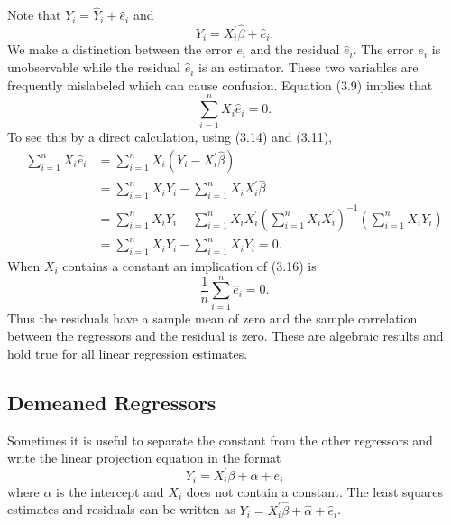 \documentclass[10pt]{article}
\begin{document}
Note that $Y_{i}=\widehat{Y}_{i}+\widehat{e}_{i}$ and
$$
Y_{i}=X_{i}^{\prime} \widehat{\beta}+\widehat{e}_{i} .
$$
We make a distinction between the error $e_{i}$ and the residual $\widehat{e}_{i}$. The error $e_{i}$ is unobservable while the residual $\widehat{e}_{i}$ is an estimator. These two variables are frequently mislabeled which can cause confusion. Equation (3.9) implies that
$$
\sum_{i=1}^{n} X_{i} \widehat{e}_{i}=0 .
$$
To see this by a direct calculation, using (3.14) and (3.11),
$$
\begin{aligned}
\sum_{i=1}^{n} X_{i} \widehat{e}_{i} &=\sum_{i=1}^{n} X_{i}\left(Y_{i}-X_{i}^{\prime} \widehat{\beta}\right) \\
&=\sum_{i=1}^{n} X_{i} Y_{i}-\sum_{i=1}^{n} X_{i} X_{i}^{\prime} \widehat{\beta} \\
&=\sum_{i=1}^{n} X_{i} Y_{i}-\sum_{i=1}^{n} X_{i} X_{i}^{\prime}\left(\sum_{i=1}^{n} X_{i} X_{i}^{\prime}\right)^{-1}\left(\sum_{i=1}^{n} X_{i} Y_{i}\right) \\
&=\sum_{i=1}^{n} X_{i} Y_{i}-\sum_{i=1}^{n} X_{i} Y_{i}=0 .
\end{aligned}
$$
When $X_{i}$ contains a constant an implication of (3.16) is
$$
\frac{1}{n} \sum_{i=1}^{n} \widehat{e}_{i}=0 .
$$
Thus the residuals have a sample mean of zero and the sample correlation between the regressors and the residual is zero. These are algebraic results and hold true for all linear regression estimates.

\subsection{Demeaned Regressors}
Sometimes it is useful to separate the constant from the other regressors and write the linear projection equation in the format
$$
Y_{i}=X_{i}^{\prime} \beta+\alpha+e_{i}
$$
where $\alpha$ is the intercept and $X_{i}$ does not contain a constant. The least squares estimates and residuals can be written as $Y_{i}=X_{i}^{\prime} \widehat{\beta}+\widehat{\alpha}+\widehat{e}_{i}$.
\end{document}
